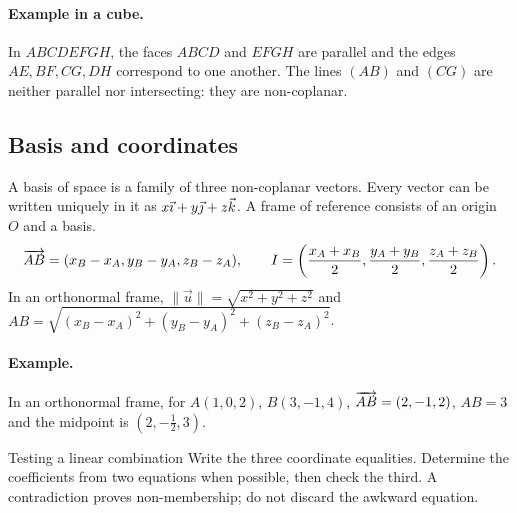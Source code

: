 \paragraph{Example in a cube.} In $ABCDEFGH$, the faces $ABCD$ and $EFGH$ are parallel and the edges $AE,BF,CG,DH$ correspond to one another. The lines $(AB)$ and $(CG)$ are neither parallel nor intersecting: they are non-coplanar.
\subsection{Basis and coordinates}
A basis of space is a family of three non-coplanar vectors. Every vector can be written uniquely in it as $x\vec{\imath} +y\vec{\jmath} +z\vec k$. A frame of reference consists of an origin $O$ and a basis.
\[\overrightarrow{AB}=(x_B-x_A,y_B-y_A,z_B-z_A),\qquad
I=\left(\frac{x_A+x_B}2,\frac{y_A+y_B}2,\frac{z_A+z_B}2\right).\]
In an orthonormal frame, $\|\vec u\|=\sqrt{x^2+y^2+z^2}$ and $AB=\sqrt{(x_B-x_A)^2+(y_B-y_A)^2+(z_B-z_A)^2}$.
\paragraph{Example.} In an orthonormal frame, for $A(1,0,2)$, $B(3,-1,4)$, $\overrightarrow{AB}=(2,-1,2)$, $AB=3$ and the midpoint is $(2,-\frac{1}{2},3)$.
\begin{methode}{Testing a linear combination}
Write the three coordinate equalities. Determine the coefficients from two equations when possible, then check the third. A contradiction proves non-membership; do not discard the awkward equation.
\end{methode}



